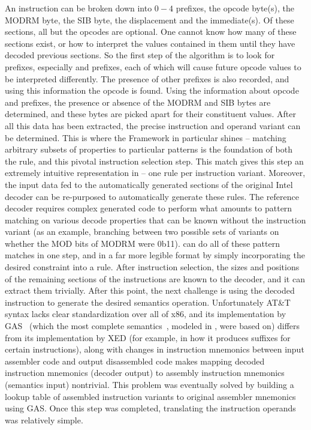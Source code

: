 An \GENISA instruction can be broken down into $0-4$ prefixes, the opcode byte(s), the MODRM byte, the SIB byte, the displacement and the immediate(s).  Of these sections, all but the opcodes are optional.  One cannot know how many of these sections exist, or how to interpret the values contained in them until they have decoded previous sections.  So the first step of the algorithm is to look for prefixes, especially  and  prefixes, each of which will cause future opcode values to be interpreted differently.  The presence of other prefixes is also recorded, and using this information the opcode is found.  Using the information about opcode and prefixes, the presence or absence of the MODRM and SIB bytes are determined, and these bytes are picked apart for their constituent values.  After all this data has been extracted, the precise instruction and operand variant can be determined.  This is where the \K Framework in particular shines – matching arbitrary subsets of properties to particular patterns is the foundation of both the \K rule, and this pivotal instruction selection step.  This match gives this step an extremely intuitive representation in \K – one rule per instruction variant.  Moreover, the input data fed to the automatically generated sections of the original Intel decoder can be re-purposed to automatically generate these \K rules.  The reference decoder requires complex generated code to perform what amounts to pattern matching on various decode properties that can be known without the instruction variant (as an example, branching between two possible sets of variants on whether the MOD bits of MODRM were 0b11).  \K can do all of these pattern matches in one step, and in a far more legible format by simply incorporating the desired constraint into a rule. After instruction selection, the sizes and positions of the remaining sections of the instructions are known to the decoder, and it can extract them trivially.  After this point, the next challenge is using the decoded instruction to generate the desired semantics operation.  Unfortunately AT\&T syntax lacks clear standardization over all of x86, and its implementation by GAS~\cite{gas} (which the most complete \ISA semantics~\cite{Dasgupta:2019}, modeled in \K, were based on) differs from its implementation by XED (for example, in how it produces suffixes for certain instructions), along with changes in instruction mnemonics between input assembler code and output disassembled code makes mapping decoded instruction mnemonics (decoder output) to assembly instruction mnemonics (semantics input) nontrivial.  This problem was eventually solved by building a lookup table of assembled instruction variants to original assembler mnemonics using GAS.  Once this step was completed, translating the instruction operands was relatively simple.

